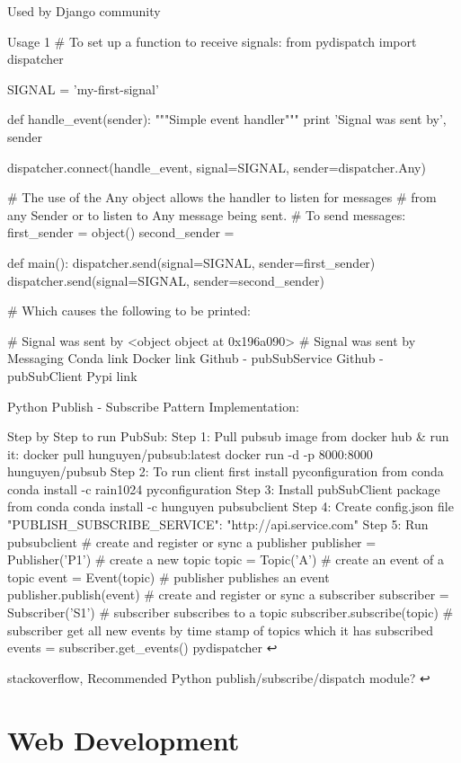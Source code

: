 Used by Django community

Usage 1
# To set up a function to receive signals:
from pydispatch import dispatcher

SIGNAL = 'my-first-signal'


def handle_event(sender):
    """Simple event handler"""
    print 'Signal was sent by', sender


dispatcher.connect(handle_event, signal=SIGNAL, sender=dispatcher.Any)

# The use of the Any object allows the handler to listen for messages
# from any Sender or to listen to Any message being sent.
# To send messages:
first_sender = object()
second_sender = {}


def main():
    dispatcher.send(signal=SIGNAL, sender=first_sender)
    dispatcher.send(signal=SIGNAL, sender=second_sender)

    # Which causes the following to be printed:

    # Signal was sent by <object object at 0x196a090>
    # Signal was sent by {}
Messaging
Conda link Docker link Github - pubSubService Github - pubSubClient Pypi link

Python Publish - Subscribe Pattern Implementation:

Step by Step to run PubSub:
Step 1: Pull pubsub image from docker hub & run it:
docker pull hunguyen/pubsub:latest
docker run -d -p 8000:8000 hunguyen/pubsub
Step 2: To run client first install pyconfiguration from conda
conda install -c rain1024 pyconfiguration
Step 3: Install pubSubClient package from conda
conda install -c hunguyen pubsubclient
Step 4: Create config.json file
{
  "PUBLISH_SUBSCRIBE_SERVICE": "http://api.service.com"
}
Step 5: Run pubsubclient
# create and register or sync a publisher
publisher = Publisher('P1')
# create a new topic
topic = Topic('A')
# create an event of a topic
event = Event(topic)
# publisher publishes an event
publisher.publish(event)
# create and register or sync a subscriber
subscriber = Subscriber('S1')
# subscriber subscribes to a topic
subscriber.subscribe(topic)
# subscriber get all new events by time stamp of topics which it has subscribed
events = subscriber.get_events()
pydispatcher ↩

stackoverflow, Recommended Python publish/subscribe/dispatch module? ↩

\section{Web Development}


